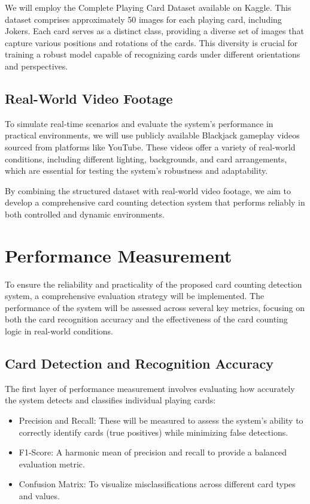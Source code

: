 \documentclass{article}
\begin{document}
We will employ the Complete Playing Card Dataset \cite{jay2020} available on Kaggle. This dataset comprises approximately 50 images for each playing card, including Jokers. Each card serves as a distinct class, providing a diverse set of images that capture various positions and rotations of the cards. This diversity is crucial for training a robust model capable of recognizing cards under different orientations and perspectives.

\subsection*{Real-World Video Footage}

To simulate real-time scenarios and evaluate the system's performance in practical environments, we will use publicly available Blackjack gameplay videos sourced from platforms like YouTube. These videos offer a variety of real-world conditions, including different lighting, backgrounds, and card arrangements, which are essential for testing the system's robustness and adaptability.

By combining the structured dataset with real-world video footage, we aim to develop a comprehensive card counting detection system that performs reliably in both controlled and dynamic environments.

\section*{Performance Measurement}

To ensure the reliability and practicality of the proposed card counting detection system, a comprehensive evaluation strategy will be implemented. The performance of the system will be assessed across several key metrics, focusing on both the card recognition accuracy and the effectiveness of the card counting logic in real-world conditions.

\subsection*{Card Detection and Recognition Accuracy}

The first layer of performance measurement involves evaluating how accurately the system detects and classifies individual playing cards:

\begin{itemize}
	\item Precision and Recall: These will be measured to assess the system’s ability to correctly identify cards (true positives) while minimizing false detections.
	\item F1-Score: A harmonic mean of precision and recall to provide a balanced evaluation metric.
	\item Confusion Matrix: To visualize misclassifications across different card types and values.
\end{itemize}
\end{document}
